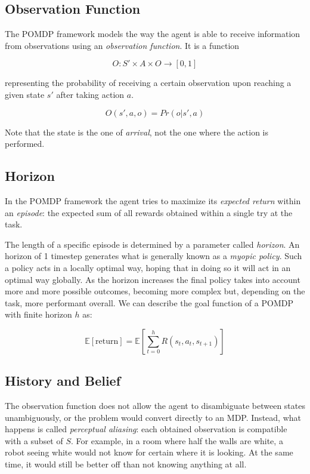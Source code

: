 \subsection{Observation Function}

The POMDP framework  models the way the agent is able to receive information from observations using
an \textit{observation function}. It is a function

\[ O : S' \times A \times O \rightarrow [0,1] \]

representing the probability of receiving a certain observation upon reaching a given state $s'$
after taking action $a$.

\[ O(s', a, o) = Pr(o | s', a) \]

Note that the state is the one of \textit{arrival}, not the one where the action is performed.



\subsection{Horizon}

In the POMDP framework the agent tries to maximize its \textit{expected return} within an
\textit{episode}: the expected sum of all rewards obtained within a single try at the task.

The length of a specific episode is determined by a parameter called \textit{horizon}. An horizon of
1 timestep generates what is generally known as a \textit{myopic policy}. Such a policy acts in a
locally optimal way, hoping that in doing so it will act in an optimal way globally. As the horizon
increases the final policy takes into account more and more possible outcomes, becoming more complex
but, depending on the task, more performant overall. We can describe the goal function of a POMDP
with finite horizon $h$ as:

\[ \mathbb{E}[\text{return}] = \mathbb{E} \left [ \sum_{t=0}^{h} R(s_t, a_t, s_{t+1}) \right ] \]

\subsection{History and Belief}

The observation function does not allow the agent to disambiguate between states unambiguously, or
the problem would convert directly to an MDP. Instead, what happens is called \textit{perceptual
aliasing}: each obtained observation is compatible with a subset of $S$. For example, in a room
where half the walls are white, a robot seeing white would not know for certain where it is looking.
At the same time, it would still be better off than not knowing anything at all.

